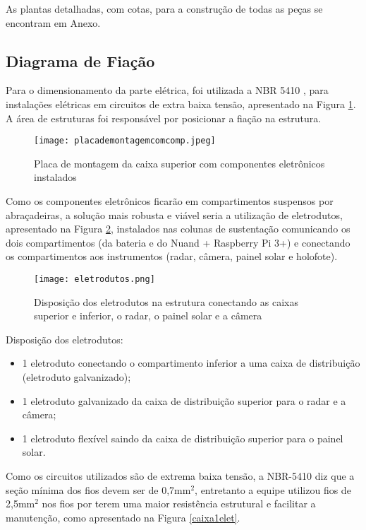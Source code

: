 As plantas detalhadas, com cotas, para a construção de todas as peças se encontram em Anexo. 

\subsection{Diagrama de Fiação}

Para o dimensionamento da parte elétrica, foi utilizada a NBR 5410 \cite{protecao}, para instalações elétricas em circuitos de extra baixa tensão, apresentado na Figura \ref{circ}. A área de estruturas foi responsável por posicionar a fiação na estrutura. 

\begin{figure}[h]
	\centering
    \texttt{[image: placademontagemcomcomp.jpeg]}
    \caption{Placa de montagem da caixa superior com componentes eletrônicos instalados}
    \label{circ}
\end{figure}


Como os componentes eletrônicos ficarão em compartimentos suspensos por abraçadeiras, a solução mais robusta e viável seria a utilização de eletrodutos, apresentado na Figura \ref{eletrod}, instalados nas colunas de sustentação comunicando os dois compartimentos (da bateria e do Nuand + Raspberry Pi 3+) e conectando os compartimentos aos instrumentos (radar, câmera, painel solar e holofote).

\begin{figure}[h]
	\centering
    \texttt{[image: eletrodutos.png]}
    \caption{Disposição dos eletrodutos na estrutura conectando as caixas superior e inferior, o radar, o painel solar e a câmera}
    \label{eletrod}
\end{figure}

Disposição dos eletrodutos:

\begin{itemize}
\item 1 eletroduto conectando o compartimento inferior a uma caixa de distribuição (eletroduto galvanizado);
\item 1 eletroduto galvanizado da caixa de distribuição superior para o radar e a câmera;
\item 1 eletroduto flexível saindo da caixa de distribuição superior para o painel solar.
\end{itemize}

Como os circuitos utilizados são de extrema baixa tensão, a NBR-5410 \cite{protecao} diz que a seção mínima dos fios devem ser de 0,7mm$^2$, entretanto a equipe utilizou fios de 2,5mm$^2$ nos fios por terem uma maior resistência estrutural e facilitar a manutenção, como apresentado na Figura \ref{caixa1elet}.

